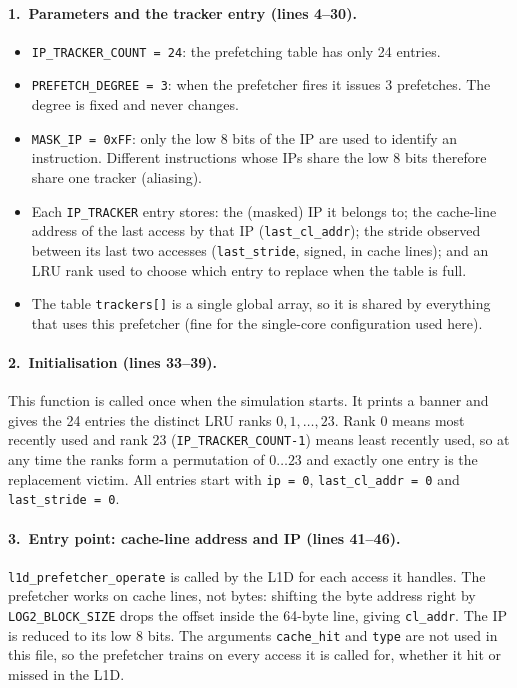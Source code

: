 \documentclass[11pt,a4paper]{article}
\begin{document}
\paragraph{1.\ Parameters and the tracker entry (lines 4--30).}

\begin{itemize}
    \item \texttt{IP\_TRACKER\_COUNT = 24}: the prefetching table has only 24 entries.
    \item \texttt{PREFETCH\_DEGREE = 3}: when the prefetcher fires it issues 3 prefetches. The
          degree is fixed and never changes.
    \item \texttt{MASK\_IP = 0xFF}: only the low 8 bits of the IP are used to identify an
          instruction. Different instructions whose IPs share the low 8 bits therefore
          share one tracker (aliasing).
    \item Each \texttt{IP\_TRACKER} entry stores: the (masked) IP it belongs to; the cache-line
          address of the last access by that IP (\texttt{last\_cl\_addr}); the stride observed
          between its last two accesses (\texttt{last\_stride}, signed, in cache lines); and an
          LRU rank used to choose which entry to replace when the table is full.
    \item The table \texttt{trackers[]} is a single global array, so it is shared by everything that
          uses this prefetcher (fine for the single-core configuration used here).
\end{itemize}

\paragraph{2.\ Initialisation (lines 33--39).}

This function is called once when the simulation starts. It prints a banner and gives the 24
entries the distinct LRU ranks $0,1,\dots,23$. Rank 0 means most recently used and rank 23
(\texttt{IP\_TRACKER\_COUNT-1}) means least recently used, so at any time the ranks form a
permutation of $0\ldots23$ and exactly one entry is the replacement victim. All entries start
with \texttt{ip = 0}, \texttt{last\_cl\_addr = 0} and \texttt{last\_stride = 0}.

\paragraph{3.\ Entry point: cache-line address and IP (lines 41--46).}

\texttt{l1d\_prefetcher\_operate} is called by the L1D for each access it handles. The
prefetcher works on cache lines, not bytes: shifting the byte address right by
\texttt{LOG2\_BLOCK\_SIZE} drops the offset inside the 64-byte line, giving \texttt{cl\_addr}.
The IP is reduced to its low 8 bits. The arguments \texttt{cache\_hit} and \texttt{type} are
not used in this file, so the prefetcher trains on every access it is called for, whether it
hit or missed in the L1D.
\end{document}
